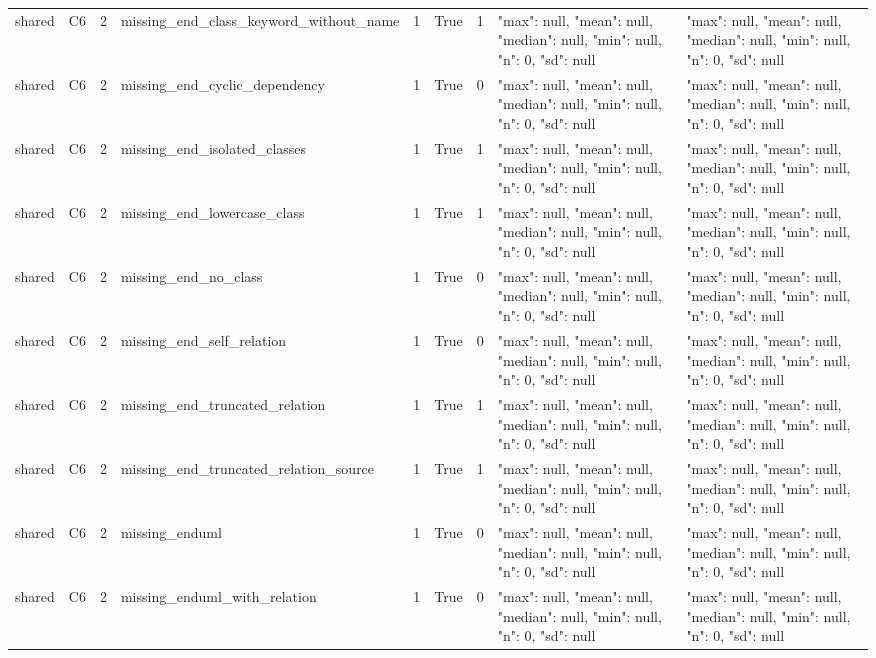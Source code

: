 \begin{tabular}{lllllllll}
shared & C6 & 2 & missing\_end\_class\_keyword\_without\_name & 1 & True & 1 & {"max": null, "mean": null, "median": null, "min": null, "n": 0, "sd": null} & {"max": null, "mean": null, "median": null, "min": null, "n": 0, "sd": null} \\
shared & C6 & 2 & missing\_end\_cyclic\_dependency & 1 & True & 0 & {"max": null, "mean": null, "median": null, "min": null, "n": 0, "sd": null} & {"max": null, "mean": null, "median": null, "min": null, "n": 0, "sd": null} \\
shared & C6 & 2 & missing\_end\_isolated\_classes & 1 & True & 1 & {"max": null, "mean": null, "median": null, "min": null, "n": 0, "sd": null} & {"max": null, "mean": null, "median": null, "min": null, "n": 0, "sd": null} \\
shared & C6 & 2 & missing\_end\_lowercase\_class & 1 & True & 1 & {"max": null, "mean": null, "median": null, "min": null, "n": 0, "sd": null} & {"max": null, "mean": null, "median": null, "min": null, "n": 0, "sd": null} \\
shared & C6 & 2 & missing\_end\_no\_class & 1 & True & 0 & {"max": null, "mean": null, "median": null, "min": null, "n": 0, "sd": null} & {"max": null, "mean": null, "median": null, "min": null, "n": 0, "sd": null} \\
shared & C6 & 2 & missing\_end\_self\_relation & 1 & True & 0 & {"max": null, "mean": null, "median": null, "min": null, "n": 0, "sd": null} & {"max": null, "mean": null, "median": null, "min": null, "n": 0, "sd": null} \\
shared & C6 & 2 & missing\_end\_truncated\_relation & 1 & True & 1 & {"max": null, "mean": null, "median": null, "min": null, "n": 0, "sd": null} & {"max": null, "mean": null, "median": null, "min": null, "n": 0, "sd": null} \\
shared & C6 & 2 & missing\_end\_truncated\_relation\_source & 1 & True & 1 & {"max": null, "mean": null, "median": null, "min": null, "n": 0, "sd": null} & {"max": null, "mean": null, "median": null, "min": null, "n": 0, "sd": null} \\
shared & C6 & 2 & missing\_enduml & 1 & True & 0 & {"max": null, "mean": null, "median": null, "min": null, "n": 0, "sd": null} & {"max": null, "mean": null, "median": null, "min": null, "n": 0, "sd": null} \\
shared & C6 & 2 & missing\_enduml\_with\_relation & 1 & True & 0 & {"max": null, "mean": null, "median": null, "min": null, "n": 0, "sd": null} & {"max": null, "mean": null, "median": null, "min": null, "n": 0, "sd": null} \\

\end{tabular}
